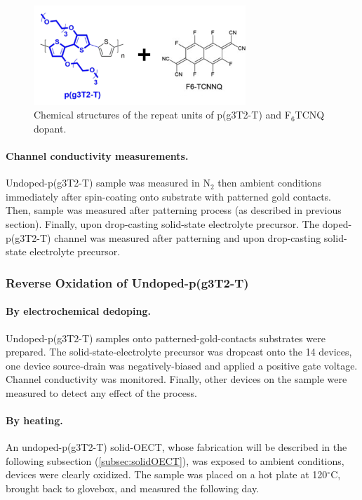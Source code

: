 \begin{figure}[ht]
  \centering
  \includegraphics[width=8cm]{Images/pdf/doping_formulas2.pdf}
  \caption{Chemical structures of the repeat units of p(g3T2-T) and F$_{6}$TCNQ dopant.}
  \label{fig:dop2}
\end{figure}

\paragraph{Channel conductivity measurements.}Undoped-p(g3T2-T) sample was measured in N$_{2}$ then ambient conditions immediately after spin-coating onto substrate with patterned gold contacts. Then, sample was measured after patterning process (as described in previous section). Finally, upon drop-casting solid-state electrolyte precursor. The doped-p(g3T2-T) channel was measured after patterning and upon drop-casting solid-state electrolyte precursor.

\subsubsection{Reverse Oxidation of Undoped-p(g3T2-T)}

\paragraph{By electrochemical dedoping.}Undoped-p(g3T2-T) samples onto patterned-gold-contacts substrates were prepared. The solid-state-electrolyte precursor was dropcast onto the 14 devices, one device source-drain was negatively-biased and applied a positive gate voltage. Channel conductivity was monitored. Finally, other devices on the sample were measured to detect any effect of the process.

\paragraph{By heating.}An undoped-p(g3T2-T) solid-OECT, whose fabrication will be described in the following subsection (\ref{subsec:solidOECT}), was exposed to ambient conditions, devices were clearly oxidized. The sample was placed on a hot plate at 120$^{\circ}$C, brought back to glovebox, and measured the following day.  %
